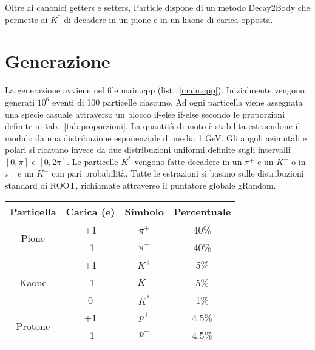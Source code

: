 \documentclass[a4paper,10pt]{article}
\begin{document}
Oltre ai canonici getters e setters, Particle dispone di un metodo Decay2Body che permette ai $K^*$ di decadere in un pione e in un kaone di carica opposta.

\section{Generazione}
La generazione avviene nel file main.cpp (list.~\ref{main.cpp}). Inizialmente vengono generati $10^6$ eventi di 100 particelle ciascuno. Ad ogni particella viene assegnata una specie casuale attraverso un blocco if-else if-else secondo le proporzioni definite in tab.~\ref{tab:proporzioni}. La quantità di moto è stabilita estraendone il modulo da una distribuzione esponenziale di media 1 GeV. Gli angoli azimutali e polari si ricavano invece da due distribuzioni uniformi definite sugli intervalli $[0,\pi]$ e $[0,2\pi]$. Le particelle $K^*$ vengono fatte decadere in un $\pi^+$ e un $K^-$ o in $\pi^-$ e un $K^+$ con pari probabilità. Tutte le estrazioni si basano sulle distribuzioni standard di ROOT, richiamate attraverso il puntatore globale gRandom.

\begin{table*}
  \caption{Proporzioni e caratteristiche delle particelle generate}
  \label{tab:proporzioni}
  \centering
  \begin{tabular}{cccc}
    \toprule
    Particella               & Carica (e) & Simbolo & Percentuale \\
    \midrule
    \multirow{2}{*}{Pione}   & +1         & $\pi^+$ & 40\%        \\
                             & -1         & $\pi^-$ & 40\%        \\
    \midrule
    \multirow{3}{*}{Kaone}   & +1         & $K^+$   & 5\%         \\
                             & -1         & $K^-$   & 5\%         \\
                             & 0          & $K^*$   & 1\%         \\
    \midrule
    \multirow{2}{*}{Protone} & +1         & $p^+$   & 4.5\%       \\
                             & -1         & $p^-$   & 4.5\%       \\
    \bottomrule
  \end{tabular}
\end{table*}
\end{document}

